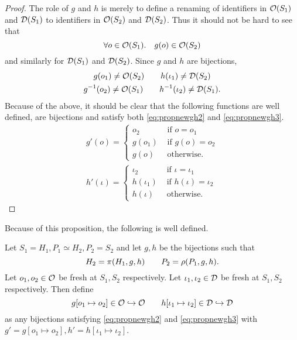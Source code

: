 \begin{proof}
  The role of $g$ and $h$ is merely to define a renaming of identifiers in
  $\mathcal{O}(S_1)$ and $\mathcal{D}(S_1)$ to identifiers in $\mathcal{O}(S_2)$ and $\mathcal{D}(S_2)$.
  Thus it should not be hard to see that
  \begin{equation*}
    \forall o \in \mathcal{O}(S_1). \quad g(o) \in \mathcal{O}(S_2)
  \end{equation*}
  and similarly for $\mathcal{D}(S_1)$ and $\mathcal{D}(S_2)$.
  Since $g$ and $h$ are bijections,
  \begin{equation*}
    \begin{gathered}
      g(o_1) \neq \mathcal{O}(S_2) \quad\quad h(\iota_1) \neq \mathcal{D}(S_2) \\
      g^{-1}(o_2) \neq \mathcal{O}(S_1) \quad\quad h^{-1}(\iota_2) \neq \mathcal{D}(S_1).
    \end{gathered}
  \end{equation*}
  Because of the above, it should be clear that the following functions are well
  defined, are bijections and satisfy both \eqref{eq:propnewgh2} and
  \eqref{eq:propnewgh3}.
  \begin{equation*}
    \begin{gathered}
      g'(o) =
      \begin{cases}
        o_2 & \text{ if } o = o_1 \\
        g(o_1) &\text{ if } g(o) = o_2 \\
        g(o) & \text{ otherwise.} 
      \end{cases} \\
      h'(\iota) =
      \begin{cases}
        \iota_2 & \text{ if } \iota = \iota_1 \\
        h(\iota_1) & \text{ if } h(\iota) = \iota_2 \\
        h(\iota) & \text{ otherwise.} 
      \end{cases}
    \end{gathered}
  \end{equation*}
\end{proof}

Because of this proposition, the following is well defined.

\begin{definition} \label{def:bijectionmod}
  Let $S_1 = H_1, P_1 \simeq H_2, P_2 = S_2$ and let $g, h$ be the bijections such that
  \begin{equation} 
    H_2 = \pi(H_1, g, h) \quad\quad P_2 = \rho(P_1, g, h).
  \end{equation}
  Let $o_1, o_2 \in \mathcal{O}$ be fresh at $S_1, S_2$ respectively.
  Let $\iota_1, \iota_2 \in \mathcal{D}$ be fresh at $S_1, S_2$ respectively.
  Then define
  \begin{equation}
    g[o_1 \mapsto o_2] \in \mathcal{O} \hookrightarrow \mathcal{O} 
    \quad\quad h[\iota_1 \mapsto \iota_2] \in \mathcal{D} \hookrightarrow \mathcal{D}
  \end{equation}
  as any bijections satisfying \eqref{eq:propnewgh2} and \eqref{eq:propnewgh3}
  with $g' = g[o_1 \mapsto o_2], h' = h[\iota_1 \mapsto \iota_2]$.
\end{definition}

